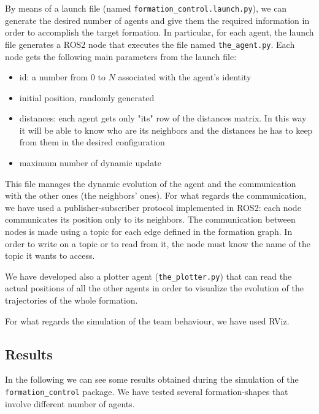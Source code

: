 \documentclass[a4paper,11pt,oneside]{book}
\begin{document}
\bigskip
By means of a launch file (named \texttt{formation\_control.launch.py}), we can generate the desired number of agents and give them the required information in order to accomplish the target formation. In particular, for each agent, the launch file generates a ROS2 node that executes the file named \texttt{the\_agent.py}. Each node gets the following main parameters from the launch file:
\begin{itemize}
\item id: a number from $0$ to $N$ associated with the agent's identity
\item initial position, randomly generated
\item distances: each agent gets only "its" row of the distances matrix. In this way it will be able to know who are its neighbors and the distances he has to keep from them in the desired configuration
\item maximum number of dynamic update
\end{itemize}
This file manages the dynamic evolution of the agent and the communication with the other ones (the neighbors' ones). For what regards the communication, we have used a publisher-subscriber protocol implemented in ROS2: each node communicates its position only to its neighbors. The communication between nodes is made using a topic for each edge defined in the formation graph. In order to write on a topic or to read from it, the node must know the name of the topic it wants to access.

\bigskip
We have developed also a plotter agent (\texttt{the\_plotter.py}) that can read the actual positions of all the other agents in order to visualize the evolution of the trajectories of the whole formation.

For what regards the simulation of the team behaviour, we have used RViz.

\subsection{Results}
In the following we can see some results obtained during the simulation of the \texttt{formation\_control} package. 
We have tested several formation-shapes that involve different number of agents.
\end{document}

